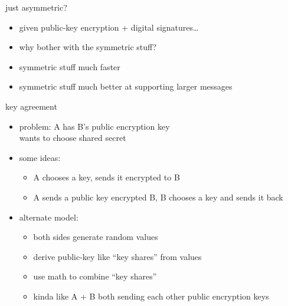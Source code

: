 \begin{frame}{just asymmetric?}
    \begin{itemize}
    \item given public-key encryption + digital signatures\ldots
    \item why bother with the symmetric stuff?
    \vspace{.5cm}
    \item symmetric stuff much faster
    \item symmetric stuff much better at supporting larger messages
    \end{itemize}
\end{frame}

\begin{frame}{key agreement}
    \begin{itemize}
    \item problem: A has B's public encryption key \\
        wants to choose shared secret 
    \vspace{.5cm}
    \item some ideas:
        \begin{itemize}
        \item A chooses a key, sends it encrypted to B
        \item A sends a public key encrypted B, B chooses a key and sends it back
        \end{itemize}
    \item<2-> alternate model:
        \begin{itemize}
        \item both sides generate random values
        \item derive public-key like ``key shares'' from values
        \item use math to combine ``key shares''
        \item kinda like A + B both sending each other public encryption keys
        \end{itemize}
    \end{itemize}
\end{frame}

